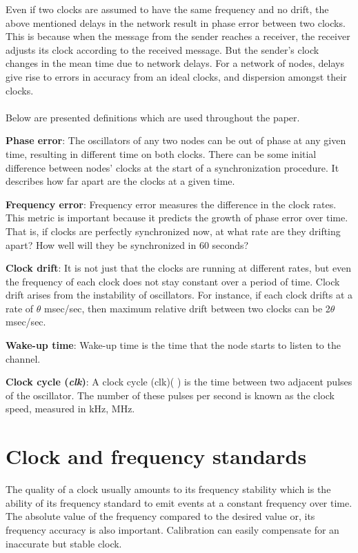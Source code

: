 \documentclass[a4paper,10pt]{report}
\begin{document}
Even if two clocks are assumed to have the same frequency and no drift, the above mentioned delays in the network result in phase
error between two clocks. This is because when the message from the sender reaches a receiver, the receiver adjusts its clock according to the received message. But the sender's clock changes in the mean time due to network delays. For a network of nodes, delays give rise to errors in accuracy from an ideal clocks, and dispersion amongst their clocks. \paragraph*{}
     Below are presented definitions which are used throughout the paper.
\begin{description}
\item \textbf{Phase error}: The oscillators of any two nodes can be out of phase at any given time, resulting in different time on both clocks. There can be some initial difference between nodes' clocks at the start of a synchronization procedure. It describes how far apart are the clocks at a given time.
\item \textbf{Frequency error}: Frequency error measures the difference in the clock rates. This metric is important because it predicts the growth of phase error over time. That is, if clocks are perfectly synchronized now, at what rate are they drifting apart? How well will they be synchronized in 60 seconds?
\item \textbf{Clock drift}: It is not just that the clocks are running at different rates, but even the frequency of each clock does not stay constant over a period of time. Clock drift arises from the instability of oscillators. For instance, if each clock drifts at a rate of $\theta$ msec/sec, then maximum relative drift between two clocks can be 2$\theta$ msec/sec.
\item \textbf{Wake-up time}: Wake-up time  is the time that the node starts to listen to the channel.
\item \textbf{Clock cycle (\textit{clk})}: A clock cycle (clk)( )
is the time between two adjacent pulses of the oscillator. The number of these pulses per second is known as the clock speed, measured in kHz, MHz.
\end{description}
\section{\textbf{Clock and frequency standards}}\par
The quality of a clock usually amounts to its frequency stability which is the ability of its frequency standard to emit
events at a constant frequency over time. The absolute value of the frequency compared to the desired value or, its frequency accuracy
is also important. Calibration can easily compensate for an inaccurate but stable clock.
\end{document}
